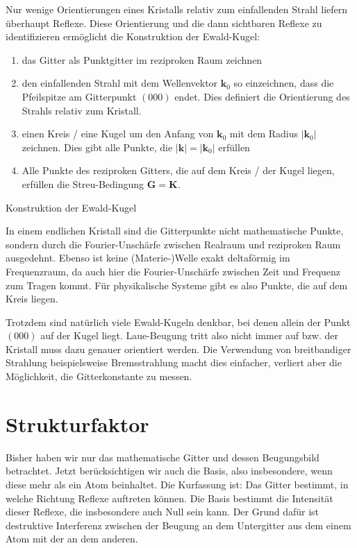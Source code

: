  
 
Nur wenige Orientierungen eines Kristalls relativ zum einfallenden Strahl liefern überhaupt Reflexe. Diese Orientierung und die dann sichtbaren Reflexe zu identifizieren ermöglicht die Konstruktion der Ewald-Kugel:
\begin{enumerate} \setlength{\itemsep}{0pt}
\item das Gitter als Punktgitter im reziproken Raum zeichnen

\item den einfallenden Strahl mit dem Wellenvektor $\mathbf{k}_0$ so einzeichnen, dass die Pfeilspitze am Gitterpunkt $(000)$ endet. Dies definiert die Orientierung des Strahls relativ zum Kristall.

\item einen Kreis / eine Kugel um den Anfang von  $\mathbf{k}_0$  mit dem Radius $|\mathbf{k}_0|$ zeichnen. Dies gibt alle Punkte, die $|\mathbf{k}| = |\mathbf{k}_0|$ erfüllen

\item Alle Punkte des reziproken Gitters, die auf dem Kreis / der Kugel liegen, erfüllen die Streu-Bedingung $\mathbf{G} =\mathbf{K} $.
\end{enumerate}

\begin{marginfigure}

\caption{ Konstruktion der Ewald-Kugel}
\end{marginfigure}


In einem endlichen Kristall sind die Gitterpunkte nicht mathematische Punkte, sondern durch die Fourier-Unschärfe zwischen Realraum und reziproken Raum ausgedehnt. Ebenso ist keine (Materie-)Welle exakt deltaförmig im Frequenzraum, da auch hier die Fourier-Unschärfe zwischen Zeit und Frequenz zum Tragen kommt. Für physikalische Systeme gibt es also Punkte, die auf dem Kreis liegen.

Trotzdem sind natürlich viele Ewald-Kugeln denkbar, bei denen allein der Punkt $(000)$ auf der Kugel liegt. Laue-Beugung tritt also nicht immer auf bzw. der Kristall muss dazu genauer orientiert werden. Die Verwendung von breitbandiger Strahlung beispielsweise Bremsstrahlung macht dies einfacher, verliert aber die Möglichkeit, die Gitterkonstante zu messen.

\section{Strukturfaktor}

Bisher haben wir nur das mathematische Gitter und dessen Beugungsbild betrachtet. Jetzt berücksichtigen wir auch die Basis, also insbesondere, wenn diese mehr als ein Atom beinhaltet. Die Kurfassung ist: Das Gitter bestimmt, in welche Richtung Reflexe auftreten können. Die Basis bestimmt die Intensität dieser Reflexe, die insbesondere auch Null sein kann. Der Grund dafür ist destruktive Interferenz zwischen der Beugung an dem Untergitter aus dem einem Atom mit der an dem anderen.

